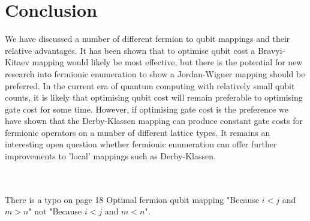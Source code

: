 \documentclass[twoside]{article}
\begin{document}
\section{Conclusion}
\raggedbottom
We have discussed a number of different fermion to qubit mappings and their relative advantages. It has been shown that to optimise qubit cost a Bravyi-Kitaev mapping would likely be most effective, but there is the potential for new research into fermionic enumeration to show a Jordan-Wigner mapping should be preferred. In the current era of quantum computing with relatively small qubit counts, it is likely that optimising qubit cost will remain preferable to optimising gate cost for some time. However, if optimising gate cost is the preference we have shown that the Derby-Klassen mapping can produce constant gate costs for fermionic operators on a number of different lattice types. It remains an interesting open question whether fermionic enumeration can offer further improvements to 'local' mappings such as Derby-Klassen.
\pagebreak

\\\\
There is a typo on page 18 Optimal fermion qubit mapping \cite{fermionicEncoding} "Because $i<j$ and $m>n$" not "Because $i<j$ and $m<n$". 
\\
        \pagebreak
\end{document}
